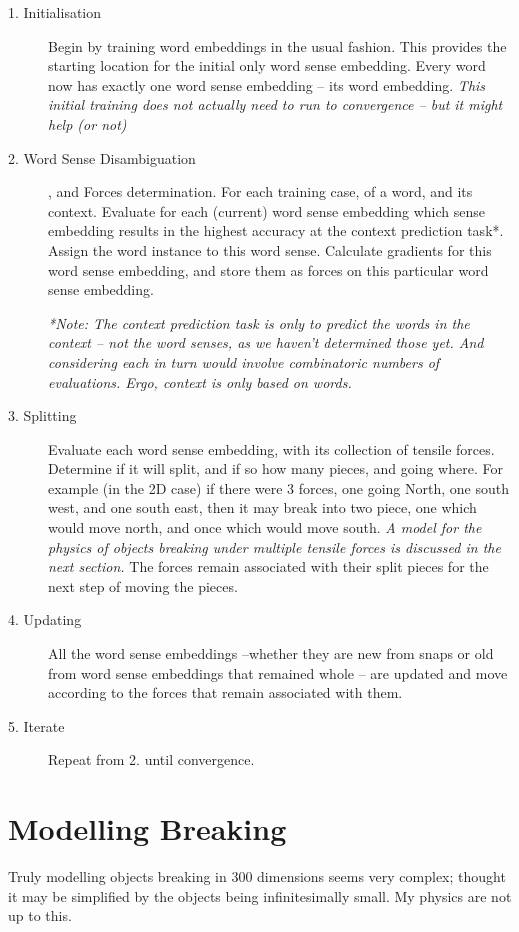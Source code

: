 \documentclass{article}
\begin{document}
\begin{description}
	\item[1. Initialisation] Begin by training word embeddings in the usual fashion. This provides the starting location for the initial only word sense embedding. Every word now has exactly one word sense embedding -- its word embedding. \emph{This initial training does not actually need to run to convergence -- but it might help (or not)}
	
	\item[2. Word Sense Disambiguation], and Forces determination. For each training case, of a word, and its context. Evaluate for each (current) word sense embedding which sense embedding results in the highest accuracy at the context prediction task*. Assign the word instance to this word sense. Calculate gradients for this word sense embedding, and store them as forces on this particular word sense embedding.
	
	\emph{*Note: The context prediction task is only to predict the words in the context -- not the word senses, as we haven't determined those yet. And considering each in turn would involve combinatoric numbers of evaluations. Ergo, context is only based on words.}
	
	\item[3. Splitting] Evaluate each word sense embedding, with its collection of tensile forces. Determine if it will split, and if so how many pieces, and going where. For example (in the 2D case) if there were 3 forces, one going North, one south west, and one south east, then it may break into two piece, one which would move north, and once which would move south.  \emph{A model for the physics of objects breaking under multiple tensile forces is discussed in the next section.} The forces remain associated with their split pieces  for the next step of moving the pieces.
	
	\item[4. Updating] All the word sense embeddings --whether they are new from snaps or old from word sense embeddings that remained whole -- are updated and move according to the forces that remain associated with them.
	
	\item[5. Iterate]  Repeat from 2. until convergence.
\end{description}

\section{Modelling Breaking}
Truly modelling objects breaking in 300 dimensions seems very complex; thought it may be simplified by the objects being infinitesimally small. My physics are not up to this.
\end{document}
